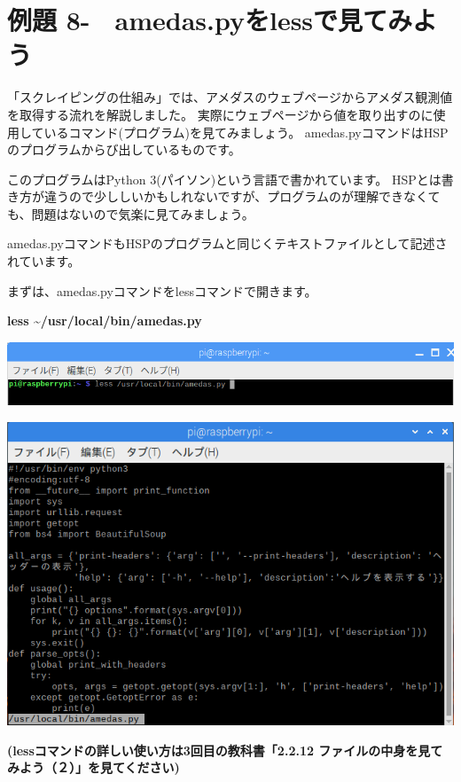 \documentclass[a4paper,12pt,dvipdfmx]{jarticle}
\newcounter{Exercise}
\renewcommand\theExercise{例題 8-\arabic{Exercise}}
\begin{document}
\bigskip


\bigskip
{}
\clearpage\section{\theExercise　amedas.pyをlessで見てみよう}
「スクレイピングの仕組み」では、アメダスのウェブページからアメダス観測値を取得する流れを解説しました。
実際にウェブページから値を取り出すのに使用しているコマンド(プログラム)を見てみましょう。
amedas.pyコマンドはHSPのプログラムからび出しているものです。

このプログラムはPython
3(パイソン)という言語で書かれています。
HSPとは書き方が違うので少ししいかもしれないですが、プログラムのが理解できなくても、問題はないので気楽に見てみましょう。


\bigskip

amedas.pyコマンドもHSPのプログラムと同じくテキストファイルとして記述されています。

まずは、amedas.pyコマンドをlessコマンドで開きます。


\bigskip

\textbf{less {\textasciitilde}/usr/local/bin/amedas.py}



\begin{center}
\includegraphics[width=17.006cm]{textbook-img036.png}

\end{center}
\begin{center}
\includegraphics[width=17.006cm]{textbook-img037.png}

\end{center}
{\bfseries
(lessコマンドの詳しい使い方は3回目の教科書「2.2.12
ファイルの中身を見てみよう（２）」を見てください)%
}
\end{document}
